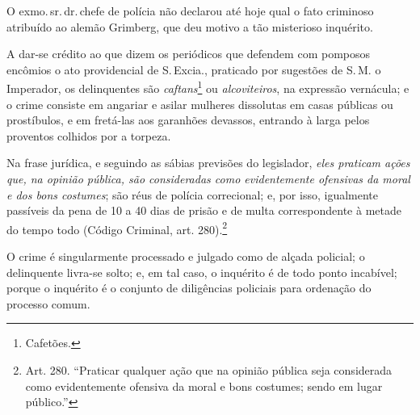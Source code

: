 O exmo.\,sr.\,dr.\,chefe de polícia não declarou até hoje qual o fato
criminoso atribuído ao alemão Grimberg, que deu motivo a tão misterioso
inquérito.

A dar-se crédito ao que dizem os periódicos que defendem com pomposos
encômios o ato providencial de S.\,Excia., praticado por sugestões de S.\,M. o Imperador, os delinquentes são \emph{caftans}\footnote{Cafetões.} ou
\emph{alcoviteiros}, na expressão vernácula; e o crime consiste em
angariar e asilar mulheres dissolutas em casas públicas ou prostíbulos,
e em fretá-las aos garanhões devassos, entrando à larga pelos proventos
colhidos por a torpeza.

Na frase jurídica, e seguindo as sábias previsões do legislador,
\emph{eles praticam ações que, na opinião pública, são consideradas como
evidentemente ofensivas da moral e dos bons costumes}; são réus de
polícia correcional; e, por isso, igualmente passíveis da pena de 10 a
40 dias de prisão e de multa correspondente à metade do tempo todo
(Código Criminal, art. 280).\footnote{Art. 280. ``Praticar
  qualquer ação que na opinião pública seja considerada como
  evidentemente ofensiva da moral e bons costumes; sendo em lugar
  público.''}

O crime é singularmente processado e julgado como de alçada policial; o
delinquente livra-se solto; e, em tal caso, o inquérito é de todo ponto
incabível; porque o inquérito é o conjunto de diligências policiais para
ordenação do processo comum.

